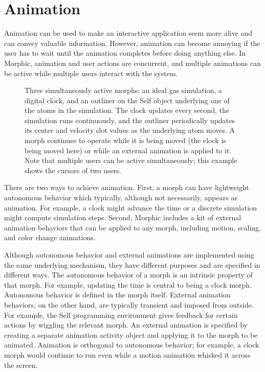 \documentclass[letterpaper,10pt,english]{sphinxmanual}
\begin{document}
\section{Animation}
\label{\detokenize{morphic:animation}}
Animation can be used to make an interactive application seem more alive and can convey valuable information. However, animation can become annoying if the user has to wait until the animation completes before doing anything else. In Morphic, animation and user actions are concurrent, and multiple animations can be active while multiple users interact with the system.
\begin{figure}[htbp]
\centering
\capstart

\noindent{}
\caption{Three simultaneously active morphs: an ideal gas simulation, a digital clock, and an outliner on the Self object underlying one of the atoms in the simulation. The clock updates every second, the simulation runs continuously, and the outliner periodically updates its center and velocity slot values as the underlying atom moves. A morph continues to operate while it is being moved (the clock is being moved here) or while an external animation is applied to it. Note that multiple users can be active simultaneously; this example shows the cursors of two users.}\label{\detokenize{morphic:id17}}\end{figure}

There are two ways to achieve animation. First, a morph can have lightweight autonomous behavior which typically, although not necessarily, appears as animation. For example, a clock might advance the time or a discrete simulation might compute simulation steps. Second, Morphic includes a kit of external animation behaviors that can be applied to any morph, including motion, scaling, and color change animations.

Although autonomous behavior and external animations are implemented using the same underlying mechanism, they have different purposes and are specified in different ways. The autonomous behavior of a morph is an intrinsic property of that morph. For example, updating the time is central to being a clock morph. Autonomous behavior is defined in the morph itself. External animation behaviors, on the other hand, are typically transient and imposed from outside. For example, the Self programming environment gives feedback for certain actions by \sphinxquotedblleft{}wiggling\sphinxquotedblright{} the relevant morph. An external animation is specified by creating a separate animation activity object and applying it to the morph to be animated. Animation is orthogonal to autonomous behavior; for example, a clock morph would continue to run even while a motion animation whisked it across the screen.
\end{document}
